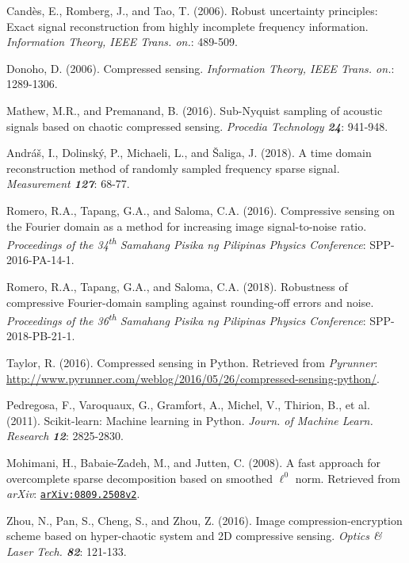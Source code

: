 \documentclass[10pt,a4paper,twoside]{article}
\begin{document}

\begin{thebibliography}{1}
\label{sec:Ref}

Cand\`{e}s, E., Romberg, J., and Tao, T. (2006). Robust uncertainty principles: Exact signal reconstruction from highly incomplete frequency information. \textit{Information Theory, IEEE Trans. on.}: 489-509.

Donoho, D. (2006). Compressed sensing. \textit{Information Theory, IEEE Trans. on.}: 1289-1306.


Mathew, M.R., and Premanand, B. (2016). Sub-Nyquist sampling of acoustic signals based on chaotic compressed sensing. \textit{Procedia Technology \textbf{24}}: 941-948.

Andr\'{a}\v{s}, I., Dolinsk\'{y}, P., Michaeli, L., and \v{S}aliga, J. (2018). A time domain reconstruction method of randomly sampled frequency sparse signal. \textit{Measurement \textbf{127}}: 68-77.

Romero, R.A., Tapang, G.A., and Saloma, C.A. (2016). Compressive sensing on the Fourier domain as a method for increasing image signal-to-noise ratio. \textit{Proceedings of the 34\textsuperscript{th} Samahang Pisika ng Pilipinas Physics Conference}: SPP-2016-PA-14-1.

Romero, R.A., Tapang, G.A., and Saloma, C.A. (2018). Robustness of compressive Fourier-domain sampling against rounding-off errors and noise. \textit{Proceedings of the 36\textsuperscript{th} Samahang Pisika ng Pilipinas Physics Conference}: SPP-2018-PB-21-1.

Taylor, R. (2016). Compressed sensing in Python. Retrieved from \textit{Pyrunner}: \url{http://www.pyrunner.com/weblog/2016/05/26/compressed-sensing-python/}.

Pedregosa, F., Varoquaux, G., Gramfort, A., Michel, V., Thirion, B., et al. (2011). Scikit-learn: Machine learning in Python. \textit{Journ. of Machine Learn. Research \textbf{12}}: 2825-2830.

Mohimani, H., Babaie-Zadeh, M., and Jutten, C. (2008). A fast approach for overcomplete sparse decomposition based on smoothed $\ell^0$ norm. Retrieved from \textit{arXiv}: \texttt{\href{https://arxiv.org/abs/0809.2508v2}{arXiv:0809.2508v2}}.

Zhou, N., Pan, S., Cheng, S., and Zhou, Z. (2016). Image compression-encryption scheme based on hyper-chaotic system and 2D compressive sensing. \textit{Optics \& Laser Tech. \textbf{82}}: 121-133.

\end{thebibliography}
\end{document}
